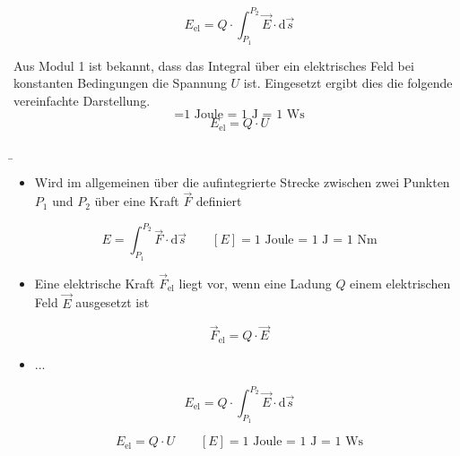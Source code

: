 {\begin{equation}
	E_\mathrm{el} = Q \cdot \int_{P_\mathrm{1}}^{P_\mathrm{2}} \vec{E} \cdot \mathrm{d}\vec{s}
\end{equation}

Aus Modul 1 ist bekannt, dass das Integral über ein elektrisches Feld bei konstanten Bedingungen die Spannung $U$ ist. 
Eingesetzt ergibt dies die folgende vereinfachte Darstellung.
\newpage
\begin{equation*}
	[E_\mathrm{el}] = \text{1 Joule = 1 J = 1 Ws} 
\end{equation*}
\vspace{0.1cm}
\begin{equation}
    E_\mathrm{el} = Q \cdot U
\end{equation}

}%
\b{
\begin{frame}
		\begin{itemize}
	    \item Wird im allgemeinen über die aufintegrierte Strecke zwischen zwei Punkten $P_\mathrm{1}$ und $P_\mathrm{2}$ über eine Kraft $\vec{F}$ definiert
	    \end{itemize}

		\begin{equation*}
			E = \int_{P_\mathrm{1}}^{P_\mathrm{2}} \vec{F} \cdot \mathrm{d}\vec{s} \quad \quad [E] = \text{1 Joule = 1 J = 1 Nm} 
		\end{equation*}
		
\end{frame}
\begin{frame}
	\begin{itemize}
	\item Eine elektrische Kraft $\vec{F}_\mathrm{{el}}$ liegt vor, wenn eine Ladung $Q$ einem elektrischen Feld $\vec{E}$ ausgesetzt ist
	\end{itemize}

	 \begin{equation*}
			\vec{F}_\mathrm{{el}} = Q \cdot \vec{E}   
	\end{equation*}
		
	\begin{itemize}
		\item ...
	\end{itemize}
		
	\begin{equation*}
			E_\mathrm{el} = Q \cdot \int_{P_\mathrm{1}}^{P_\mathrm{2}} \vec{E} \cdot \mathrm{d}\vec{s}
	\end{equation*}
		
		
		\begin{equation*}
			E_\mathrm{el} = Q \cdot U   \quad\quad  [E] = \text{1 Joule = 1 J = 1 Ws}
		\end{equation*}

\end{frame}
}%

